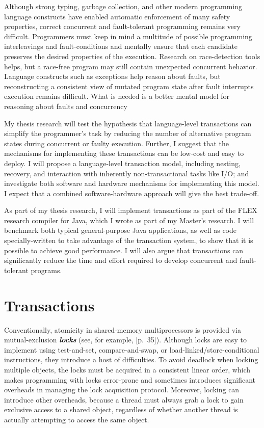 \documentclass[12pt]{article}
\newcommand{\defn}[1]           {{\textit{\textbf{\boldmath #1}}}}
\begin{document}
Although strong typing, garbage collection, and other modern
programming language constructs have enabled automatic enforcement of
many safety properties, correct concurrent and fault-tolerant
programming remains very difficult.  Programmers must keep in mind a
multitude of possible programming interleavings and fault-conditions
and mentally ensure that each candidate preserves the desired
properties of the execution.  Research on race-detection tools helps,
but a race-free program may still contain unexpected concurrent
behavior.  Language constructs such as exceptions help reason about
faults, but reconstructing a consistent view of mutated program state
after fault interrupts execution remains difficult.  What is needed is
a better mental model for reasoning about faults and concurrency

My thesis research will test the hypothesis that language-level
transactions can simplify the programmer's task by reducing the number
of alternative program states during concurrent or faulty execution.
Further, I suggest that the mechanisms for implementing
these transactions can be low-cost and easy to deploy.  I will
propose a language-level transaction model, including nesting,
recovery, and interaction with inherently non-transactional tasks like
I/O; and investigate both software and hardware mechanisms for
implementing this model.  I expect that a combined
software-hardware approach will give the best trade-off.

As part of my thesis research, I will implement transactions as part
of the FLEX research compiler for Java, which I wrote as part of my
Master's research.  I will benchmark both typical general-purpose Java
applications, as well as code specially-written to take advantage of
the transaction system, to show that it is possible to achieve good
performance.  I will also argue that transactions can significantly
reduce the time and effort required to develop concurrent and
fault-tolerant programs.

\section{Transactions}

Conventionally, atomicity in shared-memory multiprocessors is provided
via mutual-exclusion \defn{locks} (see, for example,
\cite{Tanenbaum92}[p.~35]).  Although locks are easy to
implement using test-and-set, compare-and-swap, or
load-linked/{\bp}store-conditional instructions, they introduce a host of
difficulties.  To avoid deadlock when locking multiple objects, the
locks must be acquired in a consistent linear order, which makes
programming with locks error-prone and sometimes introduces
significant overheads in managing the lock acquisition protocol.
Moreover, locking can introduce other overheads, because a thread must
always grab a lock to gain exclusive access to a shared object,
regardless of whether another thread is actually attempting to access
the same object.
\end{document}
